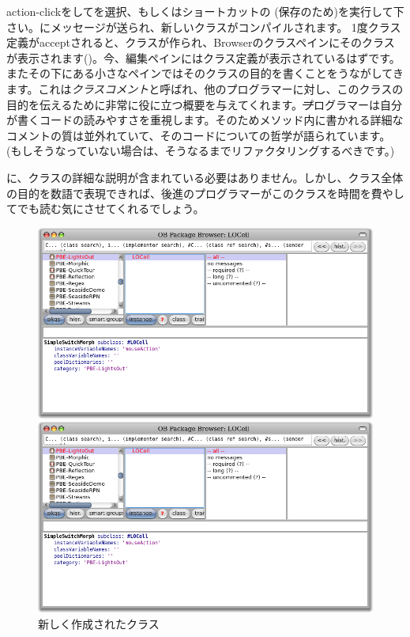 \documentclass[a4paper,10pt,twoside]{book}
\begin{document}
action-clickをしてを選択、もしくはショートカットの (保存のため)を実行して下さい。にメッセージが送られ、新しいクラスがコンパイルされます。
1度クラス定義がacceptされると、クラスが作られ、Browserのクラスペインにそのクラスが表示されます()。今、編集ペインにはクラス定義が表示されているはずです。またその下にある小さなペインではそのクラスの目的を書くことをうながしてきます。これは\emph{クラスコメント}と呼ばれ、他のプログラマーに対し、このクラスの目的を伝えるために非常に役に立つ概要を与えてくれます。\st プログラマーは自分が書くコードの読みやすさを重視します。そのためメソッド内に書かれる詳細なコメントの質は並外れていて、そのコードについての哲学が語られています。(もしそうなっていない場合は、そうなるまでリファクタリングするべきです。)

に、クラスの詳細な説明が含まれている必要はありません。しかし、クラス全体の目的を数語で表現できれば、後進のプログラマーがこのクラスを時間を費やしてでも読む気にさせてくれるでしょう。


\begin{figure}[h!t]
\ifluluelse
	{\centerline {\includegraphics[width=\textwidth]{LOCell}}}
	{\centerline {\includegraphics[scale=0.7]{LOCell}}}
\caption{新しく作成されたクラス }
\end{figure}
\end{document}
